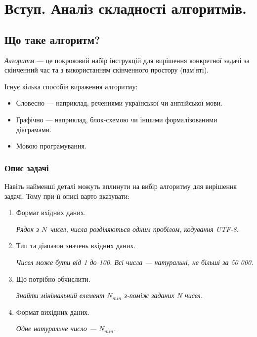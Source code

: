 \documentclass[12pt,a4paper]{report}
\begin{document}
\chapter{Вступ. Аналіз складності алгоритмів.}

\begingroup
\let\clearpage\relax
\tableofcontents
\endgroup



\section{Що таке алгоритм?}
\emph{Алгоритм} --- це покроковий набір інструкцій для вирішення конкретної задачі за скінченний час та з використанням скінченного простору (пам’яті).

\vspace{0.5em}
Існує кілька способів вираження алгоритму:
\begin{itemize}
    \item Словесно --- наприклад, реченнями української чи англійської мови.
    \item Графічно --- наприклад, блок-схемою чи іншими формалізованими діаграмами.
    \item Мовою програмування.
\end{itemize}


\begin{minipage}{\linewidth}
\subsection*{Опис задачі}
Навіть найменші деталі можуть вплинути на вибір алгоритму для вирішення задачі.
Тому при її описі варто вказувати:
\begin{enumerate}
    \item Формат вхідних даних.

        {\itshape Рядок з \(N\)\ чисел, числа розділяються одним пробілом, кодування UTF-8. }

    \item Тип та діапазон значень вхідних даних.

        {\itshape Чисел може бути від 1 до 100. Всі числа --- натуральні, не більші за 50 000.}

    \item Що потрібно обчислити.

        {\itshape Знайти мінімальний елемент \(N_{min}\) з-поміж заданих \(N\) чисел.}

    \item Формат вихідних даних.

        {\itshape Одне натуральне число --- \(N_{min}\).}

\end{enumerate}
\end{minipage}
\end{document}
